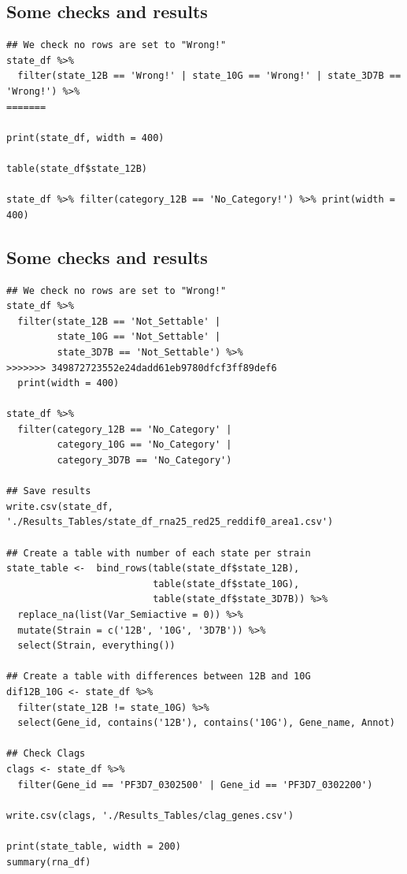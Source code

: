 \documentclass[11pt]{article}
\begin{document}
\subsection{Some checks and results}
\label{sec:orgc375b82}
\begin{verbatim}
## We check no rows are set to "Wrong!"
state_df %>%
  filter(state_12B == 'Wrong!' | state_10G == 'Wrong!' | state_3D7B == 'Wrong!') %>%
=======

print(state_df, width = 400)

table(state_df$state_12B)

state_df %>% filter(category_12B == 'No_Category!') %>% print(width = 400)

\end{verbatim}
\subsection{Some checks and results}
\label{sec:orgfbf806f}
\begin{verbatim}
## We check no rows are set to "Wrong!"
state_df %>%
  filter(state_12B == 'Not_Settable' |
         state_10G == 'Not_Settable' |
         state_3D7B == 'Not_Settable') %>%
>>>>>>> 349872723552e24dadd61eb9780dfcf3ff89def6
  print(width = 400)

state_df %>%
  filter(category_12B == 'No_Category' |
         category_10G == 'No_Category' |
         category_3D7B == 'No_Category')

## Save results
write.csv(state_df, './Results_Tables/state_df_rna25_red25_reddif0_area1.csv')

## Create a table with number of each state per strain
state_table <-  bind_rows(table(state_df$state_12B),
                          table(state_df$state_10G),
                          table(state_df$state_3D7B)) %>%
  replace_na(list(Var_Semiactive = 0)) %>%
  mutate(Strain = c('12B', '10G', '3D7B')) %>%
  select(Strain, everything())

## Create a table with differences between 12B and 10G
dif12B_10G <- state_df %>%
  filter(state_12B != state_10G) %>%
  select(Gene_id, contains('12B'), contains('10G'), Gene_name, Annot)

## Check Clags
clags <- state_df %>%
  filter(Gene_id == 'PF3D7_0302500' | Gene_id == 'PF3D7_0302200')

write.csv(clags, './Results_Tables/clag_genes.csv')

print(state_table, width = 200)
summary(rna_df)
\end{verbatim}
\end{document}
